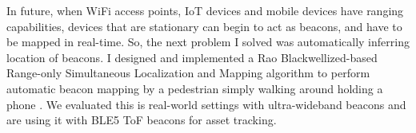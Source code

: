 \documentclass[10pt]{article}
\begin{document}
In future, when WiFi access points, IoT devices and mobile devices have ranging capabilities, devices that are stationary can begin to act as beacons, and have to be mapped in real-time. 
So, the next problem I solved was automatically inferring location of beacons. %
I designed and implemented a Rao Blackwellized-based Range-only Simultaneous Localization and Mapping algorithm to perform automatic beacon mapping by a pedestrian simply walking around holding a phone \cite{mobileAR}. We evaluated this is real-world settings with ultra-wideband beacons and are using it with BLE5 ToF beacons for asset tracking. 




\end{document}
